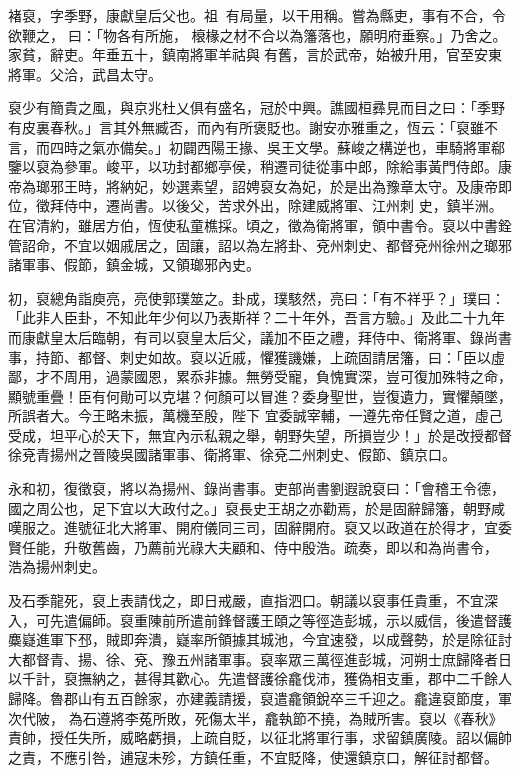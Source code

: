 \begin{pinyinscope}
 褚裒，字季野，康獻皇后父也。祖，有局量，以干用稱。嘗為縣吏，事有不合，令欲鞭之，曰：「物各有所施，
 榱椽之材不合以為籓落也，願明府垂察。」乃舍之。家貧，辭吏。年垂五十，鎮南將軍羊祜與有舊，言於武帝，始被升用，官至安東將軍。父洽，武昌太守。



 裒少有簡貴之風，與京兆杜乂俱有盛名，冠於中興。譙國桓彞見而目之曰：「季野有皮裏春秋。」言其外無臧否，而內有所褒貶也。謝安亦雅重之，恆云：「裒雖不言，而四時之氣亦備矣。」初闢西陽王掾、吳王文學。蘇峻之構逆也，車騎將軍郗鑒以裒為參軍。峻平，以功封都鄉亭侯，稍遷司徒從事中郎，除給事黃門侍郎。康帝為瑯邪王時，將納妃，妙選素望，詔娉裒女為妃，於是出為豫章太守。及康帝即位，徵拜侍中，遷尚書。以後父，苦求外出，除建威將軍、江州刺
 史，鎮半洲。在官清約，雖居方伯，恆使私童樵採。頃之，徵為衛將軍，領中書令。裒以中書銓管詔命，不宜以姻戚居之，固讓，詔以為左將卦、兗州刺史、都督兗州徐州之瑯邪諸軍事、假節，鎮金城，又領瑯邪內史。



 初，裒總角詣庾亮，亮使郭璞筮之。卦成，璞駭然，亮曰：「有不祥乎？」璞曰：「此非人臣卦，不知此年少何以乃表斯祥？二十年外，吾言方驗。」及此二十九年而康獻皇太后臨朝，有司以裒皇太后父，議加不臣之禮，拜侍中、衛將軍、錄尚書事，持節、都督、刺史如故。裒以近戚，懼獲譏嫌，上疏固請居籓，曰：「臣以虛鄙，才不周用，過蒙國恩，累忝非據。無勞受寵，負愧實深，豈可復加殊特之命，顯號重疊！臣有何勛可以克堪？何顏可以冒進？委身聖世，豈復遺力，實懼顛墜，所誤者大。今王略未振，萬機至殷，陛下
 宜委誠宰輔，一遵先帝任賢之道，虛己受成，坦平心於天下，無宜內示私親之舉，朝野失望，所損豈少！」於是改授都督徐兗青揚州之晉陵吳國諸軍事、衛將軍、徐兗二州刺史、假節、鎮京口。



 永和初，復徵裒，將以為揚州、錄尚書事。吏部尚書劉遐說裒曰：「會稽王令德，國之周公也，足下宜以大政付之。」裒長史王胡之亦勸焉，於是固辭歸籓，朝野咸嘆服之。進號征北大將軍、開府儀同三司，固辭開府。裒又以政道在於得才，宜委賢任能，升敬舊齒，乃薦前光祿大夫顧和、侍中殷浩。疏奏，即以和為尚書令，
 浩為揚州刺史。



 及石季龍死，裒上表請伐之，即日戒嚴，直指泗口。朝議以裒事任貴重，不宜深入，可先遣偏師。裒重陳前所遣前鋒督護王頤之等徑造彭城，示以威信，後遣督護麋嶷進軍下邳，賊即奔潰，嶷率所領據其城池，今宜速發，以成聲勢，於是除征討大都督青、揚、徐、兗、豫五州諸軍事。裒率眾三萬徑進彭城，河朔士庶歸降者日以千計，裒撫納之，甚得其歡心。先遣督護徐龕伐沛，獲偽相支重，郡中二千餘人歸降。魯郡山有五百餘家，亦建義請援，裒遣龕領銳卒三千迎之。龕違裒節度，軍次代陂，
 為石遵將李菟所敗，死傷太半，龕執節不撓，為賊所害。裒以《春秋》責帥，授任失所，威略虧損，上疏自貶，以征北將軍行事，求留鎮廣陵。詔以偏帥之責，不應引咎，逋寇未殄，方鎮任重，不宜貶降，使還鎮京口，解征討都督。




\end{pinyinscope}
